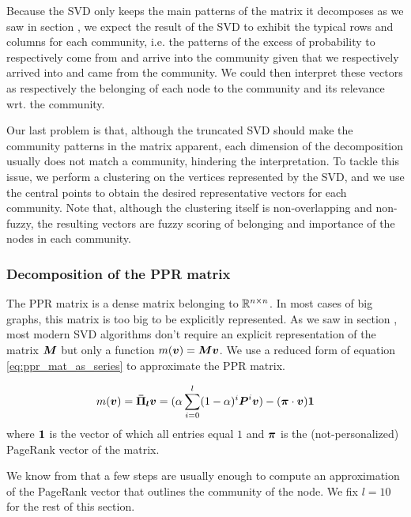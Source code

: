 Because the SVD only keeps the main patterns of the matrix it decomposes as we saw in section , we expect the result of the SVD to exhibit the typical rows and columns for each community, i.e. the patterns of the excess of probability to respectively come from and arrive into the community given that we respectively arrived into and came from the community.
We could then interpret these vectors as respectively the belonging of each node to the community and its relevance wrt. the community.

Our last problem is that, although the truncated SVD should make the community patterns in the matrix apparent, each dimension of the decomposition usually does not match a community, hindering the interpretation. To tackle this issue, we perform a clustering on the vertices represented by the SVD, and we use the central points to obtain the desired representative vectors for each community. Note that, although the clustering itself is non-overlapping and non-fuzzy, the resulting vectors are fuzzy scoring of belonging and importance of the nodes in each community.

\subsubsection{Decomposition of the PPR matrix}
The PPR matrix is a dense matrix belonging to $\mathbb{R}^{n\times n}$. In most cases of big graphs, this matrix is too big to be explicitly represented. As we saw in section , most modern SVD algorithms don't require an explicit representation of the matrix $\boldsymbol{M}$ but only a function $m(\boldsymbol{v}) = \boldsymbol{M}\boldsymbol{v}$. We use a reduced form of equation \eqref{eq:ppr_mat_as_series} to approximate the PPR matrix.

\begin{equation}
    m(\boldsymbol{v}) = \boldsymbol{\Bar{\Pi}_l}\boldsymbol{v} = (\alpha \sum_{i=0}^l (1-\alpha)^i\boldsymbol{P}^i\boldsymbol{v}) - (\boldsymbol{\pi} \cdot \boldsymbol{v}) \boldsymbol{1}
\end{equation}
\noindent where $\boldsymbol{1}$ is the vector of which all entries equal $1$ and $\boldsymbol{\pi}$ is the (not-personalized) PageRank vector of the matrix.

We know from \cite{Kloumann2014} that a few steps are usually enough to compute an approximation of the PageRank vector that outlines the community of the node. We fix $l=10$ for the rest of this section.


